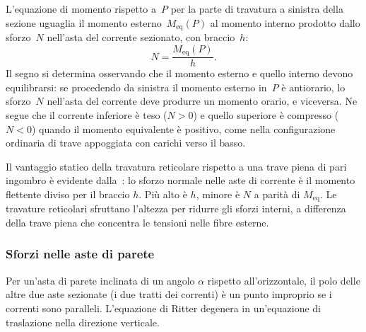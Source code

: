 L'equazione di momento rispetto a~$P$ per la parte
di travatura a sinistra della sezione uguaglia il
momento esterno~$M_\text{eq}(P)$ al momento
interno prodotto dallo sforzo~$N$ nell'asta del
corrente sezionato, con braccio~$h$:
\begin{equation}\label{eq:N_corrente}
	N = \frac{M_\text{eq}(P)}{h}.
\end{equation}
Il segno si determina osservando che il momento
esterno e quello interno devono equilibrarsi: se
procedendo da sinistra il momento esterno in~$P$
è antiorario, lo sforzo~$N$ nell'asta del corrente
deve produrre un momento orario, e viceversa.
Ne segue che il corrente inferiore è teso
($N > 0$) e quello superiore è compresso ($N < 0$)
quando il momento equivalente è positivo,
come nella configurazione ordinaria di trave
appoggiata con carichi verso il basso.

\begin{oss}
	Il vantaggio statico della travatura reticolare
	rispetto a una trave piena di pari ingombro è
	evidente dalla~: lo sforzo
	normale nelle aste di corrente è il momento
	flettente diviso per il braccio $h$. Più alto
	è $h$, minore è $N$ a parità di $M_\text{eq}$.
	Le travature reticolari sfruttano l'altezza
	per ridurre gli sforzi interni, a differenza
	della trave piena che concentra le tensioni
	nelle fibre esterne.
\end{oss}


\subsubsection{Sforzi nelle aste di parete}
\label{subsec:sforzi_parete}

Per un'asta di parete inclinata di un angolo $\alpha$
rispetto all'orizzontale, il polo delle altre due
aste sezionate (i due tratti dei correnti) è
un punto improprio se i correnti sono paralleli.
L'equazione di Ritter degenera in un'equazione
di traslazione nella direzione verticale.

